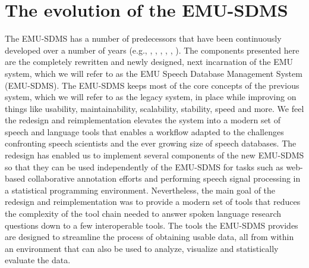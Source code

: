 \documentclass[]{book}
\theoremstyle{definition}
\theoremstyle{definition}
\theoremstyle{definition}
\theoremstyle{remark}
\begin{document}
\hypertarget{the-evolution-of-the-emu-sdms}{%
\section{The evolution of the
EMU-SDMS}\label{the-evolution-of-the-emu-sdms}}

The EMU-SDMS has a number of predecessors that have been continuously
developed over a number of years (e.g., \citet{harrington:csl1993a},
\citet{cassidy:1996a}, \citet{cassidy:sc2001a}, \citet{bombien:2006a},
\citet{harrington:2010a}, \citet{john:2012a}). The components presented
here are the completely rewritten and newly designed, next incarnation
of the EMU system, which we will refer to as the EMU Speech Database
Management System (EMU-SDMS). The EMU-SDMS keeps most of the core
concepts of the previous system, which we will refer to as the legacy
system, in place while improving on things like usability,
maintainability, scalability, stability, speed and more. We feel the
redesign and reimplementation elevates the system into a modern set of
speech and language tools that enables a workflow adapted to the
challenges confronting speech scientists and the ever growing size of
speech databases. The redesign has enabled us to implement several
components of the new EMU-SDMS so that they can be used independently of
the EMU-SDMS for tasks such as web-based collaborative annotation
efforts and performing speech signal processing in a statistical
programming environment. Nevertheless, the main goal of the redesign and
reimplementation was to provide a modern set of tools that reduces the
complexity of the tool chain needed to answer spoken language research
questions down to a few interoperable tools. The tools the EMU-SDMS
provides are designed to streamline the process of obtaining usable
data, all from within an environment that can also be used to analyze,
visualize and statistically evaluate the data.
\end{document}
